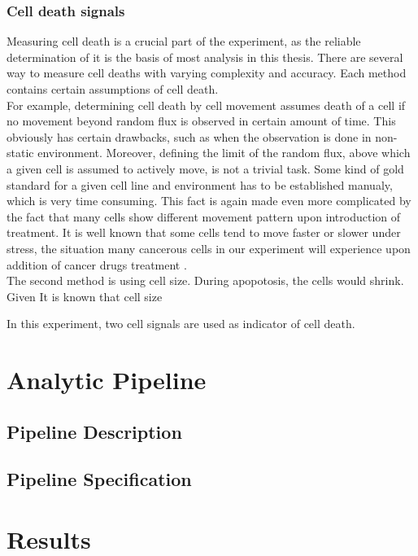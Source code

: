 \documentclass[pdftex,12pt,a4paper]{report}
\begin{document}
\subsection{Cell death signals}

Measuring cell death is a crucial part of the experiment, as the reliable determination of it is the basis of most analysis in this thesis. There are several way to measure cell deaths with varying complexity and accuracy. Each method contains certain assumptions of cell death.\\

For example, determining cell death by cell movement assumes death of a cell if no movement beyond random flux is observed in certain amount of time. This obviously has certain drawbacks, such as when the observation is done in non-static environment. Moreover, defining the limit of the random flux, above which a given cell is assumed to actively move, is not a trivial task. Some kind of gold standard for a given cell line and environment has to be established manualy, which is very time consuming. This fact is again made even more complicated by the fact that many cells show different movement pattern upon introduction of treatment. It is well known that some cells tend to move faster or slower under stress, the situation many cancerous cells in our experiment will experience upon addition of cancer drugs treatment \cite{pienta1991effects, fenteany2003small, ruocco2012suppressing}.\\

The second method is using cell size. During apopotosis, the cells would shrink. Given It is known that cell size %

In this experiment, two cell signals are used as indicator of cell death. %

\chapter{Analytic Pipeline}

\section{Pipeline Description}

\section{Pipeline Specification}

\chapter{Results}
\end{document}
